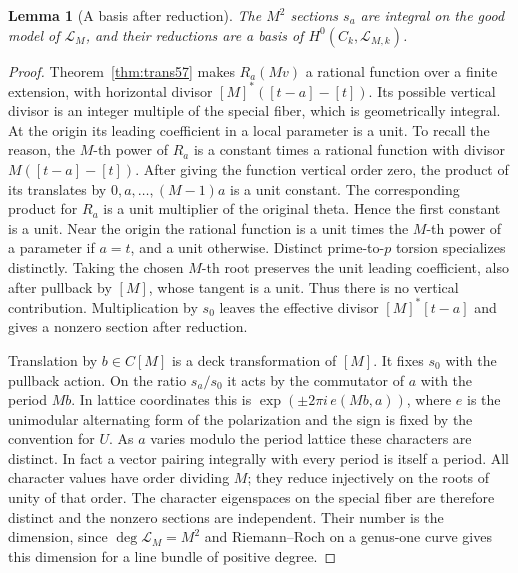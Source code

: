 \documentclass[a4paper,11pt]{article}
\newtheorem{lemma}[proposition]{Lemma}
\theoremstyle{definition}
\theoremstyle{remark}
\numberwithin{equation}{section}
\begin{document}
\begin{lemma}[A basis after reduction]\leavevmode
\label{lem:torsionbasis481}
The \(M^2\) sections \(s_a\) are integral on the good model
of \(\mathcal L_M\), and their reductions are a basis of
\(H^0(C_k,\mathcal L_{M,k})\).
\end{lemma}
\begin{proof}
Theorem~\ref{thm:trans57} makes \(R_a(Mv)\) a rational function
over a finite extension, with horizontal divisor
\([M]^*([t-a]-[t])\). Its possible vertical divisor is an integer
multiple of the special fiber, which is geometrically integral.
At the origin its leading coefficient in a local parameter is a
unit. To recall the reason, the \(M\)-th power of \(R_a\) is a
constant times a rational function with divisor
\(M([t-a]-[t])\). After giving the function vertical order
zero, the product of its translates by \(0,a,\ldots,(M-1)a\)
is a unit constant. The corresponding product for \(R_a\) is
a unit multiplier of the original theta. Hence the first constant
is a unit. Near the origin the rational function is a unit times
the \(M\)-th power of a parameter if \(a=t\), and a unit otherwise.
Distinct prime-to-\(p\) torsion specializes distinctly. Taking the
chosen \(M\)-th root preserves the unit leading coefficient,
also after pullback by \([M]\), whose tangent is a unit. Thus
there is no vertical contribution. Multiplication by \(s_0\)
leaves the effective divisor \([M]^*[t-a]\) and gives a nonzero
section after reduction.

Translation by \(b\in C[M]\) is a deck transformation of \([M]\).
It fixes \(s_0\) with the pullback action. On the ratio \(s_a/s_0\)
it acts by the commutator of \(a\) with the period \(Mb\).
In lattice coordinates this is
\(\exp(\pm2\pi i\,e(Mb,a))\), where \(e\) is the unimodular
alternating form of the polarization and the sign is fixed by
the convention for \(U\). As \(a\) varies modulo the period
lattice these characters are distinct. In fact a vector pairing
integrally with every period is itself a period. All character
values have order dividing \(M\); they reduce injectively on the
roots of unity of that order. The character eigenspaces on the
special fiber are therefore distinct and the nonzero sections
are independent. Their number is the dimension, since
\(\deg\mathcal L_M=M^2\) and Riemann--Roch on a genus-one curve
gives this dimension for a line bundle of positive degree.
\end{proof}
\end{document}
